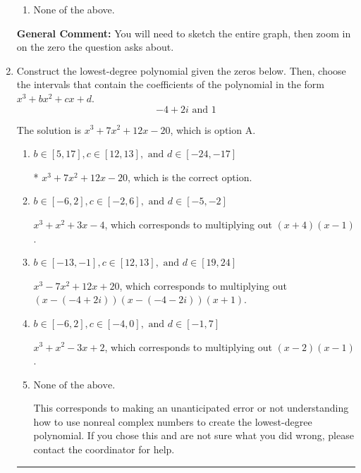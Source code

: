 \documentclass{extbook}[14pt]
\newcommand{\litem}[1]{\item #1

\rule{\textwidth}{0.4pt}}
\begin{document}
\begin{enumerate}
{\begin{enumerate}[label=\Alph*.]
\item None of the above.\end{enumerate}
\textbf{General Comment:} You will need to sketch the entire graph, then zoom in on the zero the question asks about.
}
\litem{
Construct the lowest-degree polynomial given the zeros below. Then, choose the intervals that contain the coefficients of the polynomial in the form $x^3+bx^2+cx+d$.
\[ -4 + 2 i \text{ and } 1 \]

The solution is \( x^{3} +7 x^{2} +12 x -20 \), which is option A.\begin{enumerate}[label=\Alph*.]
\item \( b \in [5, 17], c \in [12, 13], \text{ and } d \in [-24, -17] \)

* $x^{3} +7 x^{2} +12 x -20$, which is the correct option.
\item \( b \in [-6, 2], c \in [-2, 6], \text{ and } d \in [-5, -2] \)

$x^{3} + x^{2} +3 x -4$, which corresponds to multiplying out $(x + 4)(x -1)$.
\item \( b \in [-13, -1], c \in [12, 13], \text{ and } d \in [19, 24] \)

$x^{3} -7 x^{2} +12 x + 20$, which corresponds to multiplying out $(x-(-4 + 2 i))(x-(-4 - 2 i))(x + 1)$.
\item \( b \in [-6, 2], c \in [-4, 0], \text{ and } d \in [-1, 7] \)

$x^{3} + x^{2} -3 x + 2$, which corresponds to multiplying out $(x -2)(x -1)$.
\item \( \text{None of the above.} \)

This corresponds to making an unanticipated error or not understanding how to use nonreal complex numbers to create the lowest-degree polynomial. If you chose this and are not sure what you did wrong, please contact the coordinator for help.
\end{enumerate}

}
\end{enumerate}
\end{document}
